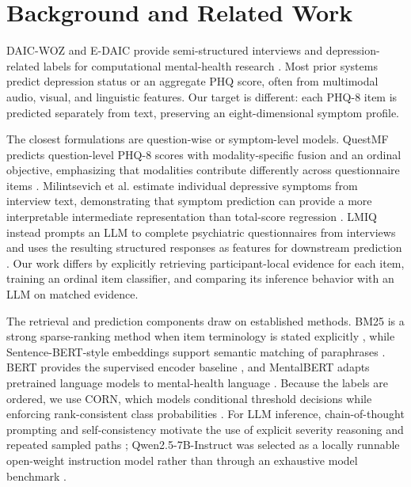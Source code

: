\documentclass{article}
\begin{document}
\section{Background and Related Work}
\label{sec:background}
DAIC-WOZ and E-DAIC provide semi-structured interviews and depression-related labels for computational mental-health research \cite{gratch2014daic,devault2014simsensei,ringeval2019avec}. Most prior systems predict depression status or an aggregate PHQ score, often from multimodal audio, visual, and linguistic features. Our target is different: each PHQ-8 item is predicted separately from text, preserving an eight-dimensional symptom profile.

The closest formulations are question-wise or symptom-level models. QuestMF predicts question-level PHQ-8 scores with modality-specific fusion and an ordinal objective, emphasizing that modalities contribute differently across questionnaire items \cite{mandal2025questmf}. Milintsevich et al. estimate individual depressive symptoms from interview text, demonstrating that symptom prediction can provide a more interpretable intermediate representation than total-score regression \cite{milintsevich2023symptom}. LMIQ instead prompts an LLM to complete psychiatric questionnaires from interviews and uses the resulting structured responses as features for downstream prediction \cite{rosenman2024lmiq}. Our work differs by explicitly retrieving participant-local evidence for each item, training an ordinal item classifier, and comparing its inference behavior with an LLM on matched evidence.

The retrieval and prediction components draw on established methods. BM25 is a strong sparse-ranking method when item terminology is stated explicitly \cite{robertson2009probabilistic}, while Sentence-BERT-style embeddings support semantic matching of paraphrases \cite{reimers2019sentencebert}. BERT provides the supervised encoder baseline \cite{devlin2019bert}, and MentalBERT adapts pretrained language models to mental-health language \cite{ji2022mentalbert}. Because the labels are ordered, we use CORN, which models conditional threshold decisions while enforcing rank-consistent class probabilities \cite{shi2021corn,cao2020coral}. For LLM inference, chain-of-thought prompting and self-consistency motivate the use of explicit severity reasoning and repeated sampled paths \cite{wei2022cot,wang2022selfconsistency}; Qwen2.5-7B-Instruct was selected as a locally runnable open-weight instruction model rather than through an exhaustive model benchmark \cite{qwen2025technical}.
\end{document}

